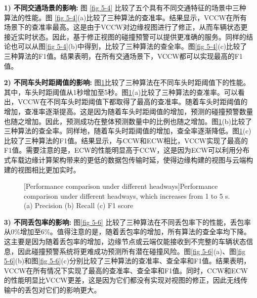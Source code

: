 \textbf{1) 不同交通场景的影响:}
图 \ref{fig 5-4} 比较了五个具有不同交通特征的场景中三种算法的性能。图 \ref{fig 5-4}(a)比较了三种算法的查准率。结果显示，VCCW在所有场景下的查准率最高。这是由于VCCW对边缘视图进行了修正，从而车辆状态更接近实时状态。因此，基于修正视图的碰撞预警可以提供更准确的服务。同样的结论也可以从图\ref{fig 5-4}(b)中得到，比较了三种算法的查全率。图\ref{fig 5-4}(c)比较了三种算法的F1值。结果表明，在所有交通场景下，VCCW都可以实现最高的F1值。

\textbf{2) 不同车头时距阈值的影响:}
图\ref{fig 5-5}比较了三种算法在不同车头时距阈值下的性能。其中，车头时距阈值从1秒增加至5秒。图\ref{fig 5-5}(a)比较了三种算法的查准率。可以看出，VCCW在不同车头时距阈值下都取得了最高的查准率。随着车头时距阈值的增加，查准率逐渐提高。这是因为随着车头时距阈值的增加，预测的碰撞预警数量也随之增加。因此，预测成功在整体预测数量中的比例也随之增加。图\ref{fig 5-5}(b)比较了三种算法的查全率。同样地，随着车头时距阈值的增加，查全率逐渐降低。图\ref{fig 5-5}(c)比较了三种算法的F1值。结果显示，与CCW和ECW相比，VCCW实现了最高的F1值。需要注意的是，ECW的性能明显高于CCW，这是因为ECW可以利用分布式车载边缘计算架构带来的更低的数据包传输时延，使得边缘构建的视图与云端构建的视图相比更加实时。

\begin{figure}[h]
     \centering
     [Performance comparison under different headways]{Performance comparison under different headways, which increases from 1 to 5 s. (a) Precision (b) Recall (c) F1 score}
     \label{fig 5-5}
\end{figure}

\textbf{3) 不同丢包率的影响:}
图\ref{fig 5-6} 比较了三种算法在不同丢包率下的性能，丢包率从0\%增加至6\%。值得注意的是，随着丢包率的增加，所有算法的查全率均下降。这主要是因为随着丢包率的增加，边缘节点或云端仅能接收到不完整的车辆状态信息，因此碰撞预警系统将更难成功预测所有潜在碰撞风险。图\ref{fig 5-6}(a)、图\ref{fig 5-6}(b)和图\ref{fig 5-6}(c)分别比较了三种算法的查准率、查全率和F1值。结果表明，VCCW在所有情况下实现了最高的查准率、查全率和F1值。同时，CCW和ECW的性能明显比VCCW更差，这是因为它们都没有实现对视图的修正，因此无线传输中的丢包对它们的影响更大。


